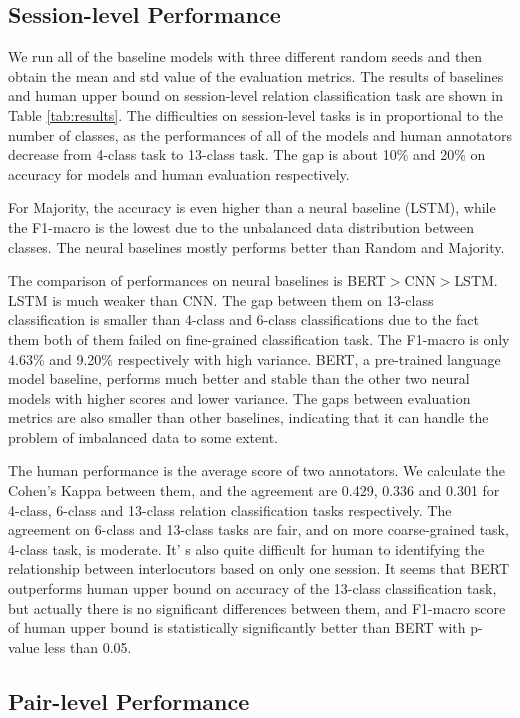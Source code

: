 \documentclass[letterpaper]{article} \usepackage{aaai21}  \usepackage{times}  \usepackage{helvet} \usepackage{courier}  \usepackage[hyphens]{url}  \usepackage{graphicx} \usepackage{xcolor}
\begin{document}
\subsection{Session-level Performance}
We run all of the baseline models with three different random seeds and then obtain the mean and
std value of the evaluation metrics. The results of baselines and human upper bound on session-level relation classification task 
are shown in Table \ref{tab:results}. The difficulties on session-level tasks is in proportional to the number of classes, as the performances of all of the models and human annotators decrease from 4-class task to 13-class task. The gap is about 10\% and 20\% on accuracy for models and human evaluation respectively. 

For Majority, the accuracy is even higher than a neural baseline (LSTM), while the F1-macro is the lowest due to the unbalanced data distribution between classes. The neural baselines mostly performs better than Random and Majority.

The comparison of performances on neural baselines is BERT$>$CNN$>$LSTM. LSTM is much weaker than CNN. The gap between them on 13-class classification is smaller than 4-class and 6-class classifications due to the fact them both of them failed on fine-grained classification task. The F1-macro is only 4.63\% and 9.20\% respectively with high variance.
BERT, a pre-trained language model baseline, performs much better and stable than the other two neural models with higher scores and lower variance. The gaps between evaluation metrics are also smaller than other baselines, indicating that it can handle the problem of imbalanced data to some extent.

The human performance is the average score of two annotators. We calculate the Cohen's Kappa between them, and the agreement are 0.429, 0.336 and 0.301 for 4-class, 6-class and 13-class relation classification tasks respectively. The agreement on 6-class and 13-class tasks are fair, and on more coarse-grained task, 4-class task, is moderate. It' s also quite difficult for human to identifying the relationship between interlocutors based on only one session. It seems that BERT outperforms human upper bound on accuracy of the 13-class classification task, but actually there is no significant differences between them, and F1-macro score of human upper bound is statistically significantly better than BERT with p-value less than 0.05.



\subsection{Pair-level Performance}
\end{document}
